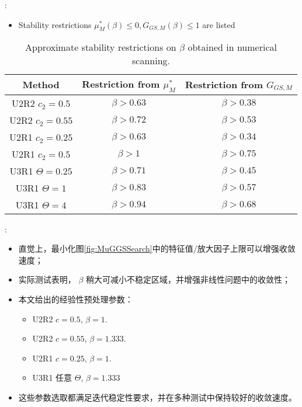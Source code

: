\documentclass[aspectratio=169,serif]{beamer} %
\begin{document}
\begin{frame}{\secname: \subsecname}
  \small
  \begin{itemize}
    \item Stability restrictions $\mu^*_{M}(\beta) \leq 0,G_{GS,M}(\beta) \leq 1$ are listed
  \end{itemize}
  \footnotesize
  \begin{table}[htbp]
    \centering
    \begin{tabular}{|c|c|c|}
      \hline
      Method             & Restriction from $\mu^*_{M}$ & Restriction from $G_{GS,M}$ \\
      \hline
      U2R2 $c_2=0.5$     & $\beta > 0.63$               & $\beta > 0.38$              \\
      \hline
      U2R2 $c_2=0.55$    & $\beta > 0.72$               & $\beta > 0.53$              \\
      \hline
      U2R1 $c_2=0.25$    & $\beta > 0.63$               & $\beta > 0.34$              \\
      \hline
      U2R1 $c_2=0.5$     & $\beta > 1$                  & $\beta > 0.75$              \\
      \hline
      U3R1 $\Theta=0.25$ & $\beta > 0.71$               & $\beta > 0.45$              \\
      \hline
      U3R1 $\Theta=1$    & $\beta > 0.83$               & $\beta > 0.57$              \\
      \hline
      U3R1 $\Theta=4$    & $\beta > 0.94$               & $\beta > 0.68$              \\
      \hline
    \end{tabular}
    \caption{Approximate stability restrictions on $\beta$ obtained in numerical scanning.}
    \label{tab:resrictionBetaSearch}
  \end{table}
\end{frame}



\begin{frame}{\secname: \subsecname}
  \small
  \begin{itemize}
    \item 直觉上，最小化图\ref{fig:MuGGSSearch}中的特征值/放大因子上限可以增强收敛速度；
    \item 实际测试表明， $\beta$ 稍大可减小不稳定区域，并增强非线性问题中的收敛性；
    \item 本文给出的经验性预处理参数：
          \begin{itemize}
            \item U2R2 $c=0.5$, $\beta = 1$.
            \item U2R2 $c=0.55$, $\beta = 1.333$.
            \item U2R1 $c=0.25$, $\beta = 1$.
            \item U3R1 任意 $\Theta$, $\beta = 1.333$
          \end{itemize}
    \item 这些参数选取都满足迭代稳定性要求，并在多种测试中保持较好的收敛速度。
  \end{itemize}
\end{frame}
\end{document}
